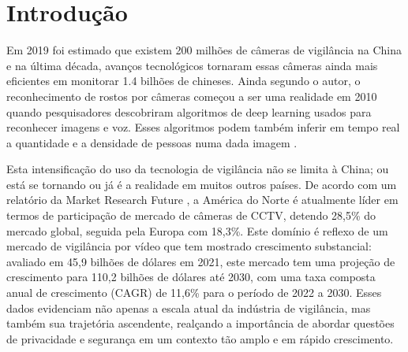 \documentclass[12pt, %
openright, 
oneside, %
a4paper,    %
brazil]{facom-ufu-abntex2}
\begin{document}

\tableofcontents*
\cleardoublepage

\textual


\chapter[Introdução]{Introdução}
Em 2019 foi estimado que existem 200 milhões de câmeras de vigilância na China
e na última década, avanços tecnológicos tornaram essas câmeras ainda mais
eficientes em monitorar 1.4 bilhões de chineses. Ainda segundo o autor, o
reconhecimento de rostos por câmeras começou a ser uma realidade em 2010 quando
pesquisadores descobriram algoritmos de deep learning usados para reconhecer
imagens e voz. Esses algoritmos podem também inferir em tempo real a quantidade
e a densidade de pessoas numa dada imagem \cite{qiang2019road}.

Esta intensificação do uso da tecnologia de vigilância não se limita à China;
ou está se tornando ou já é a realidade em muitos outros países. De acordo com
um relatório da Market Research Future \cite{Gupta2018}, a América do Norte é
atualmente líder em termos de participação de mercado de câmeras de CCTV,
detendo 28,5\% do mercado global, seguida pela Europa com 18,3\%. Este domínio
é reflexo de um mercado de vigilância por vídeo que tem mostrado crescimento
substancial: avaliado em 45,9 bilhões de dólares em 2021, este mercado tem uma
projeção de crescimento para 110,2 bilhões de dólares até 2030, com uma taxa
composta anual de crescimento (CAGR) de 11,6\% para o período de 2022 a 2030.
Esses dados evidenciam não apenas a escala atual da indústria de vigilância,
mas também sua trajetória ascendente, realçando a importância de abordar
questões de privacidade e segurança em um contexto tão amplo e em rápido
crescimento.
\end{document}
